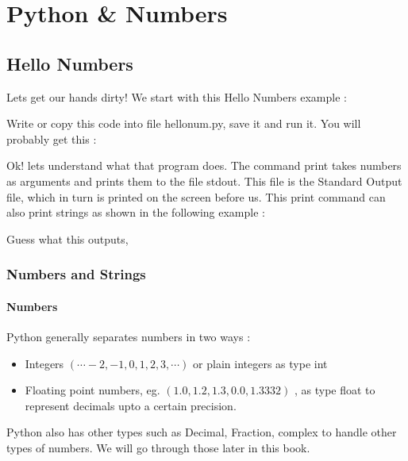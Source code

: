 
\chapter{Python \& Numbers}

\section{Hello Numbers}

Lets get our hands dirty! We start with this {\color{magenta} Hello Numbers} example :


Write or copy this code into file {\color{magenta} hellonum.py,}  save it and run it. You will probably get this :


Ok! lets understand what that program does. The command {\color{magenta} print} takes numbers as arguments
 and prints them to the file {\color{magenta} stdout}. This file is the Standard Output file, which in turn is printed
on the screen before us. This print command can also print strings as shown in the following example :


Guess what this outputs,


\subsection{Numbers and Strings}
\subsubsection{Numbers}
Python generally separates numbers in two ways :

\begin{itemize}
\item Integers $(\cdots -2, -1, 0, 1, 2, 3, \cdots)$ or plain integers as type {\color{cyan} int}
\item Floating point numbers, eg. $(1.0, 1.2, 1.3, 0.0, 1.3332)$ , as type {\color{cyan} float} to represent decimals upto a certain precision.
\end{itemize}

Python also has other types such as {\color{cyan} Decimal}, {\color{cyan} Fraction}, {\color{cyan} complex}
to handle other types of numbers. We will go through those later in this book.

